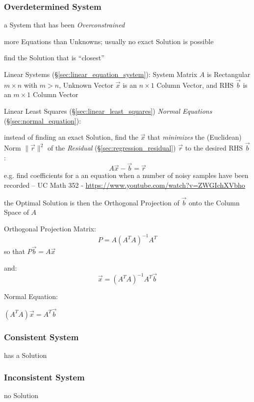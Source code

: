 \subsubsection{Overdetermined System}\label{sec:overdetermined_system}

a System that has been \emph{Overconstrained}

more Equations than Unknowns; usually no exact Solution is possible

find the Solution that is ``closest''

Linear Systems (\S\ref{sec:linear_equation_system}): System Matrix $A$ is
Rectangular $m \times n$ with $m > n$, Unknown Vector $\vec{x}$ is an $n \times
1$ Column Vector, and RHS $\vec{b}$ is an $m \times 1$ Column Vector

Linear Least Squares (\S\ref{sec:linear_least_squares}) \emph{Normal Equations}
(\S\ref{sec:normal_equation}):

instead of finding an exact Solution, find the $\vec{x}$ that \emph{minimizes}
the (Euclidean) Norm $\|\vec{r}\|^2$ of the \emph{Residual}
(\S\ref{sec:regression_residual}) $\vec{r}$ to the desired RHS $\vec{b}$:
\[
  A\vec{x} - \vec{b} = \vec{r}
\]
e.g. find coefficients for a an equation when a number of noisy samples have
been recorded -- UC Math 352 - \url{https://www.youtube.com/watch?v=ZWGIchXVbho}

the Optimal Solution is then the Orthogonal Projection of $\vec{b}$ onto the
Column Space of $A$

Orthogonal Projection Matrix:
\[
  P = A(A^TA)^{-1}A^T
\]
so that $P\vec{b} = A\vec{x}$

and:
\[
  \vec{x} = (A^TA)^{-1}A^T\vec{b}
\]

Normal Equation:

$(A^TA)\vec{x} = A^T\vec{b}$



\subsubsection{Consistent System}\label{sec:consistent_system}

has a Solution



\subsubsection{Inconsistent System}\label{sec:inconsistent_system}

no Solution



